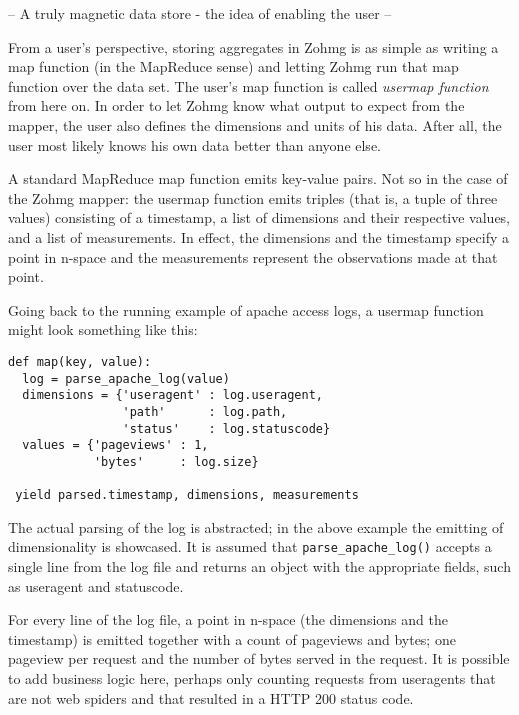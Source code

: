 \documentclass[a4paper,10pt]{book}
\begin{document}

-- A truly magnetic data store - the idea of enabling the user --

From a user's perspective, storing aggregates in Zohmg is as simple as writing
a map function (in the MapReduce sense) and letting Zohmg run that map function
over the data set. The user's map function is called \textit{usermap function}
from here on. In order to let Zohmg know what output to expect from the mapper,
the user also defines the dimensions and units of his data. After all, the user
most likely knows his own data better than anyone else.

A standard MapReduce map function emits key-value pairs. Not so in the case of
the Zohmg mapper: the usermap function emits triples (that is, a tuple of three
values) consisting of a timestamp, a list of dimensions and their respective
values, and a list of measurements. In effect, the dimensions and the timestamp
specify a point in n-space and the measurements represent the observations made
at that point.

Going back to the running example of apache access logs, a usermap function
might look something like this:

\begin{verbatim}
def map(key, value):
  log = parse_apache_log(value)
  dimensions = {'useragent' : log.useragent,
                'path'      : log.path,
                'status'    : log.statuscode}
  values = {'pageviews' : 1,
            'bytes'     : log.size}

 yield parsed.timestamp, dimensions, measurements
\end{verbatim}

\vspace{12pt}

The actual parsing of the log is abstracted; in the above example the
emitting of dimensionality is showcased. It is assumed that
\texttt{parse\_apache\_log()} accepts a single line from the log file and
returns an object with the appropriate fields, such as useragent and
statuscode.

For every line of the log file, a point in n-space (the dimensions and the
timestamp) is emitted together with a count of pageviews and bytes; one
pageview per request and the number of bytes served in the request. It is
possible to add business logic here, perhaps only counting requests from
useragents that are not web spiders and that resulted in a HTTP 200 status
code.
\end{document}
